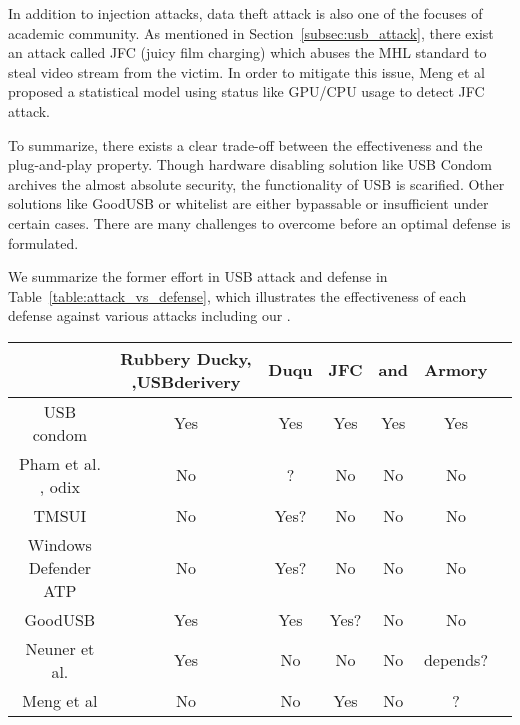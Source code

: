 In addition to injection attacks, data theft attack is also one of the focuses of academic community. As mentioned in Section~\ref{subsec:usb_attack}, there exist an attack called JFC (juicy film charging)\cite{JFC} which abuses the MHL standard to steal video stream from the victim. In order to mitigate this issue, Meng et al proposed a statistical model using status like GPU/CPU usage to detect JFC attack\cite{meng2018252}.

To summarize, there exists a clear trade-off between the effectiveness and the plug-and-play property. Though hardware disabling solution like USB Condom archives the almost absolute security, the functionality of USB is scarified. Other solutions like GoodUSB or whitelist are either bypassable or insufficient under certain cases. There are many challenges to overcome before an optimal defense is formulated.

We summarize the former effort in USB attack and defense in Table~\ref{table:attack_vs_defense}, which illustrates the effectiveness of each defense against various attacks including our \tool.
\begin{table*}
	\centering
	\begin{tabular}{|c|c|c|c|c|c|c|}
		
		
		\hline
		\diagbox[width=1.46in] {Defence}{Attack} & Rubbery Ducky\cite{rubber}, \cite{rubberducky2020},USBderivery\cite{usbdriver} & Duqu\cite{duqu} & JFC\cite{JFCImpact}&\cite{smartphone}\cite{poweremi} and \cite{usbdriver}& Armory\\
		
		\hline 
		USB condom \cite{Condom}& Yes & Yes & Yes & Yes & Yes\\
		\hline 
		Pham et al. \cite{pham2010optimizing}, odix\cite{OLEA}& No & ? & No & No & No\\
		\hline 
		TMSUI\cite{yang2015tmsui}& No & Yes? & No & No & No\\
		\hline 
		Windows Defender ATP\cite{windenfenderwhite}& No & Yes? & No & No & No\\
		\hline 
		GoodUSB\cite{tian2015defending}& Yes & Yes & Yes? & No & No \\

		\hline
		Neuner et al.\cite{neuner2018usblock}& Yes & No & No & No & depends? \\
		\hline
		Meng et al\cite{meng2018252}& No & No & Yes & No & ?\\
		\hline
	\end{tabular}
	\linebreak
	\caption{Effectiveness of defense against different attacks}
	\label{table:attack_vs_defense}
\end{table*}




